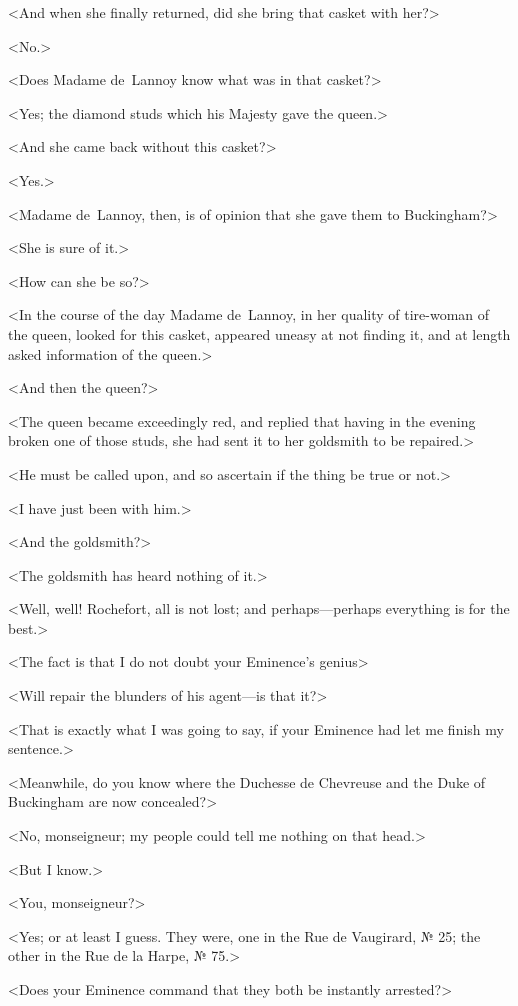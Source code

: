 <And when she finally returned, did she bring that casket with her?> 

<No.> 

<Does Madame de~Lannoy know what was in that casket?> 

<Yes; the diamond studs which his Majesty gave the queen.> 

<And she came back without this casket?> 

<Yes.> 

<Madame de~Lannoy, then, is of opinion that she gave them to Buckingham?> 

<She is sure of it.> 

<How can she be so?> 

<In the course of the day Madame de~Lannoy, in her quality of tire-woman of the queen, looked for this casket, appeared uneasy at not finding it, and at length asked information of the queen.> 

<And then the queen?> 

<The queen became exceedingly red, and replied that having in the evening broken one of those studs, she had sent it to her goldsmith to be repaired.> 

<He must be called upon, and so ascertain if the thing be true or not.> 

<I have just been with him.> 

<And the goldsmith?> 

<The goldsmith has heard nothing of it.> 

<Well, well! Rochefort, all is not lost; and perhaps—perhaps everything is for the best.> 

<The fact is that I do not doubt your Eminence's genius\longdash> 

<Will repair the blunders of his agent—is that it?> 

<That is exactly what I was going to say, if your Eminence had let me finish my sentence.> 

<Meanwhile, do you know where the Duchesse de Chevreuse and the Duke of Buckingham are now concealed?> 

<No, monseigneur; my people could tell me nothing on that head.> 

<But I know.> 

<You, monseigneur?> 

<Yes; or at least I guess. They were, one in the Rue de Vaugirard, № 25; the other in the Rue de la Harpe, № 75.> 

<Does your Eminence command that they both be instantly arrested?> 


